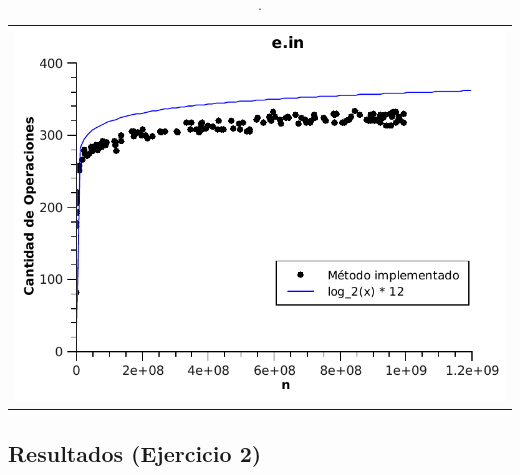 	\begin{table}[h!]
		\centering 
			\begin{tabular}{c}
				\includegraphics[scale = 0.8]{./../ej1/tests/e.pdf}
			\end{tabular}
			\caption{.}
			\label{grafico4} 
	\end{table}
	

\pagebreak[4]
\clearpage


\subsection{Resultados (Ejercicio 2)}
\label{resultadosej2}


